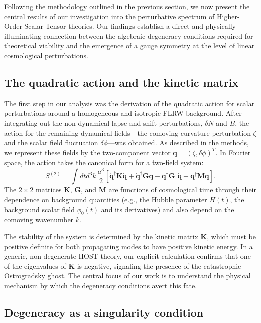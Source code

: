 \documentclass[twocolumn]{aastex631}
\begin{document}
Following the methodology outlined in the previous section, we now present the central results of our investigation into the perturbative spectrum of Higher-Order Scalar-Tensor theories. Our findings establish a direct and physically illuminating connection between the algebraic degeneracy conditions required for theoretical viability and the emergence of a gauge symmetry at the level of linear cosmological perturbations.

\subsection{The quadratic action and the kinetic matrix}

The first step in our analysis was the derivation of the quadratic action for scalar perturbations around a homogeneous and isotropic FLRW background. After integrating out the non-dynamical lapse and shift perturbations, $\delta N$ and $B$, the action for the remaining dynamical fields---the comoving curvature perturbation $\zeta$ and the scalar field fluctuation $\delta\phi$---was obtained. As described in the methods, we represent these fields by the two-component vector $\mathbf{q} = (\zeta, \delta\phi)^T$. In Fourier space, the action takes the canonical form for a two-field system:
\begin{equation}
S^{(2)} = \int dt d^3k \, \frac{a^3}{2} \left[ \dot{\mathbf{q}}^\dagger \mathbf{K} \dot{\mathbf{q}} + \dot{\mathbf{q}}^\dagger \mathbf{G} \mathbf{q} - \mathbf{q}^\dagger \mathbf{G}^\dagger \dot{\mathbf{q}} - \mathbf{q}^\dagger \mathbf{M} \mathbf{q} \right].
\label{eq:S2_results}
\end{equation}
The $2 \times 2$ matrices $\mathbf{K}$, $\mathbf{G}$, and $\mathbf{M}$ are functions of cosmological time through their dependence on background quantities (e.g., the Hubble parameter $H(t)$, the background scalar field $\phi_0(t)$ and its derivatives) and also depend on the comoving wavenumber $k$.

The stability of the system is determined by the kinetic matrix $\mathbf{K}$, which must be positive definite for both propagating modes to have positive kinetic energy. In a generic, non-degenerate HOST theory, our explicit calculation confirms that one of the eigenvalues of $\mathbf{K}$ is negative, signaling the presence of the catastrophic Ostrogradsky ghost. The central focus of our work is to understand the physical mechanism by which the degeneracy conditions avert this fate.

\subsection{Degeneracy as a singularity condition}
\end{document}
